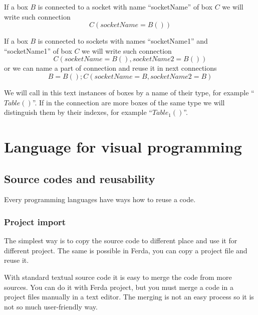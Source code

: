 \documentclass[a4paper,12pt]{book}
\begin{document}
If a box $B$ is connected to a socket with name ``socketName'' of box $C$ we will write such connection
\begin{equation}
C(socketName=B())
\end{equation}

If a box $B$ is connected to sockets with names ``socketName1'' and ``socketName1'' of box $C$ we will write such connection
\begin{equation}
C(socketName=B(), socketName2=B())
\end{equation}
or we can name a part of connection and reuse it in next connections
\begin{equation}
B=B(); C(socketName=B, socketName2=B)
\end{equation}

We will call in this text instances of boxes by a name of their type, for example ``$Table()$''. If in the connection are more boxes of the same type we will distinguish them by their indexes, for example ``$Table_1()$''.


\chapter{Language for visual programming}
\section{Source codes and reusability}
Every programming languages have ways how to reuse a code. 

\subsection{Project import}
The simplest way is to copy the source code to different place and use it for different project. The same is possible in Ferda, you can copy a project file and reuse it.

With standard textual source code it is easy to merge the code from more sources. You can do it with Ferda project, but you must merge a code in a project files manually in a text editor. The merging is not an easy process so it is not so much user-friendly way.
\end{document}
